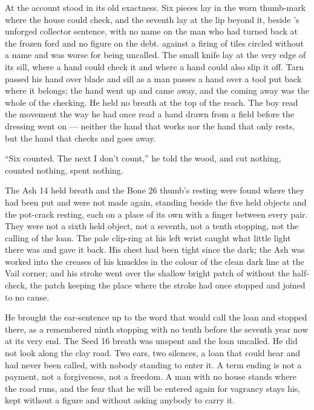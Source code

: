 At  the account stood in its old exactness. Six pieces lay in the worn thumb-mark where the house could check, and the seventh lay at the lip beyond it, beside 's unforged collector sentence, with no name on the man who had turned back at the frozen ford and no figure on the debt.  against a firing of tiles circled without a name and was worse for being uncalled. The small knife lay at the very edge of its sill, where a hand could check it and where a hand could also slip it off. Tarn passed his hand over blade and sill as a man passes a hand over a tool put back where it belongs; the hand went up and came away, and the coming away was the whole of the checking. He held no breath at the top of the reach. The boy read the movement the way he had once read a hand drawn from a field before the dressing went on --- neither the hand that works nor the hand that only rests, but the hand that checks and goes away.

“Six counted. The next I don't count,” he told the wood, and cut nothing, counted nothing, spent nothing.

The Ash 14 held breath and the Bone 26 thumb's resting were found where they had been put and were not made again, standing beside the five held objects and the pot-crack resting, each on a place of its own with a finger between every pair. They were not a sixth held object, not a seventh, not a tenth stopping, not the calling of the loan. The pale clip-ring at his left wrist caught what little light there was and gave it back. His chest had been tight since the dark; the Ash was worked into the creases of his knuckles in the colour of the clean dark line at the Vail corner; and his stroke went over the shallow bright patch of  without the half-check, the patch keeping the place where the stroke had once stopped and joined to no cause.

He brought the ear-sentence up to the word that would call the loan and stopped there, as a remembered ninth stopping with no tenth before the seventh year now at its very end. The Seed 16 breath was unspent and the loan uncalled. He did not look along the clay road. Two ears, two silences, a loan that could hear and had never been called, with nobody standing to enter it. A term ending is not a payment, not a forgiveness, not a freedom. A man with no house stands where the road runs, and the fear that he will be entered again for vagrancy stays his, kept without a figure and without asking anybody to carry it.

